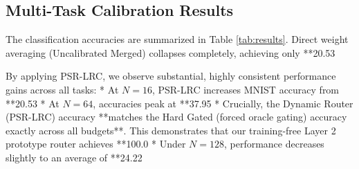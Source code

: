 \documentclass{article}
\theoremstyle{plain}
\theoremstyle{definition}
\theoremstyle{remark}
\begin{document}
\subsection{Multi-Task Calibration Results}
The classification accuracies are summarized in Table \ref{tab:results}.
Direct weight averaging (Uncalibrated Merged) collapses completely, achieving only **20.53%

By applying PSR-LRC, we observe substantial, highly consistent performance gains across all tasks:
*   At $N = 16$, PSR-LRC increases MNIST accuracy from **20.53%
*   At $N = 64$, accuracies peak at **37.95%
*   Crucially, the Dynamic Router (PSR-LRC) accuracy **matches the Hard Gated (forced oracle gating) accuracy exactly across all budgets**. This demonstrates that our training-free Layer 2 prototype router achieves **100.0%
*   Under $N = 128$, performance decreases slightly to an average of **24.22%
\end{document}
